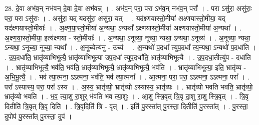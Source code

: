 \documentclass[17pt]{extarticle}
\begin{document}
28. दे॒वा अभ॑व॒न् नभ॑वन् दे॒वा दे॒वा अभ॑वन्न् । . अभ॑व॒न् परा॒ परा ऽभ॑व॒न् नभ॑व॒न् परा᳚ । . परा ऽसु॑रा॒ असु॑राः॒ परा॒ परा ऽसु॑राः । . असु॑रा॒ यद् यदसु॑रा॒ असु॑रा॒ यत् । . यद॑क्ष्णयास्तो॒मीया॑ अक्ष्णयास्तो॒मीया॒ यद् यद॑क्ष्णयास्तो॒मीयाः᳚ । . अ॒क्ष्ण॒या॒स्तो॒मीया॑ अ॒न्यथा॒ ऽन्यथा᳚ ऽक्ष्णयास्तो॒मीया॑ अक्ष्णयास्तो॒मीया॑ अ॒न्यथा᳚ । . अ॒क्ष्ण॒या॒स्तो॒मीया॒ इत्य॑क्ष्णया - स्तो॒मीयाः᳚ । . अ॒न्यथा॒ ऽनूच्या॒ नूच्या॒ न्यथा॒ ऽन्यथा॒ ऽनूच्य॑ । . अ॒नूच्या॒ न्यथा॒ ऽन्यथा॒ ऽनूच्या॒ नूच्या॒ न्यथा᳚ । . अ॒नूच्येत्य॑नु - उच्य॑ । . अ॒न्यथो॑ प॒दधा᳚ त्युप॒दधा᳚ त्य॒न्यथा॒ ऽन्यथो॑ प॒दधा॑ति । . उ॒प॒दधा॑ति॒ भ्रातृ॑व्याभिभूत्यै॒ भ्रातृ॑व्याभिभूत्या उप॒दधा᳚ त्युप॒दधा॑ति॒ भ्रातृ॑व्याभिभूत्यै । . उ॒प॒दधा॒तीत्यु॑प - दधा॑ति । . भ्रातृ॑व्याभिभूत्यै॒ भव॑ति॒ भव॑ति॒ भ्रातृ॑व्याभिभूत्यै॒ भ्रातृ॑व्याभिभूत्यै॒ भव॑ति । . भ्रातृ॑व्याभिभूत्या॒ इति॒ भ्रातृ॑व्य - अ॒भि॒भू॒त्यै॒ । . भव॑ त्या॒त्मना॒ ऽऽत्मना॒ भव॑ति॒ भव॑ त्या॒त्मना᳚ । . आ॒त्मना॒ परा॒ परा॒ ऽऽत्मना॒ ऽऽत्मना॒ परा᳚ । . परा᳚ ऽस्यास्य॒ परा॒ परा᳚ ऽस्य । . अ॒स्य॒ भ्रातृ॑व्यो॒ भ्रातृ॑व्यो ऽस्यास्य॒ भ्रातृ॑व्यः । . भ्रातृ॑व्यो भवति भवति॒ भ्रातृ॑व्यो॒ भ्रातृ॑व्यो भवति । . भ॒व॒ त्या॒शु रा॒शुर् भ॑वति भव त्या॒शुः । . आ॒शु स्त्रि॒वृत् त्रि॒वृ दा॒शु रा॒शु स्त्रि॒वृत् । . त्रि॒वृ दितीति॑ त्रि॒वृत् त्रि॒वृ दिति॑ । . त्रि॒वृदिति॑ त्रि - वृत् । . इति॑ पु॒रस्ता᳚त् पु॒रस्ता॒ दितीति॑ पु॒रस्ता᳚त् । . पु॒रस्ता॒ दुपोप॑ पु॒रस्ता᳚त् पु॒रस्ता॒ दुप॑ । \newline
\end{document}
